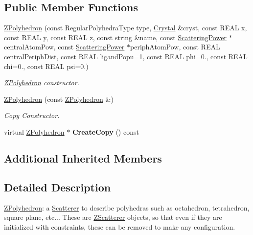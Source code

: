 \subsection*{Public Member Functions}
\begin{DoxyCompactItemize}
\item 
\mbox{\hyperlink{class_obj_cryst_1_1_z_polyhedron_a624314fc85edd2b27e572e33c1487bed}{Z\+Polyhedron}} (const Regular\+Polyhedra\+Type type, \mbox{\hyperlink{class_obj_cryst_1_1_crystal}{Crystal}} \&cryst, const R\+E\+AL x, const R\+E\+AL y, const R\+E\+AL z, const string \&name, const \mbox{\hyperlink{class_obj_cryst_1_1_scattering_power}{Scattering\+Power}} $\ast$central\+Atom\+Pow, const \mbox{\hyperlink{class_obj_cryst_1_1_scattering_power}{Scattering\+Power}} $\ast$periph\+Atom\+Pow, const R\+E\+AL central\+Periph\+Dist, const R\+E\+AL ligand\+Popu=1, const R\+E\+AL phi=0., const R\+E\+AL chi=0., const R\+E\+AL psi=0.)
\begin{DoxyCompactList}\small\item\em \mbox{\hyperlink{class_obj_cryst_1_1_z_polyhedron}{Z\+Polyhedron}} constructor. \end{DoxyCompactList}\item 
\mbox{\label{class_obj_cryst_1_1_z_polyhedron_a7d9b825ac03903e63d072c53fc791f50}} 
\mbox{\hyperlink{class_obj_cryst_1_1_z_polyhedron_a7d9b825ac03903e63d072c53fc791f50}{Z\+Polyhedron}} (const \mbox{\hyperlink{class_obj_cryst_1_1_z_polyhedron}{Z\+Polyhedron}} \&)
\begin{DoxyCompactList}\small\item\em Copy Constructor. \end{DoxyCompactList}\item 
\mbox{\label{class_obj_cryst_1_1_z_polyhedron_a5a14d182712517c9ecfeadbc31efb4a2}} 
virtual \mbox{\hyperlink{class_obj_cryst_1_1_z_polyhedron}{Z\+Polyhedron}} $\ast$ {\bfseries Create\+Copy} () const
\end{DoxyCompactItemize}
\subsection*{Additional Inherited Members}


\subsection{Detailed Description}
\mbox{\hyperlink{class_obj_cryst_1_1_z_polyhedron}{Z\+Polyhedron}}\+: a \mbox{\hyperlink{class_obj_cryst_1_1_scatterer}{Scatterer}} to describe polyhedras such as octahedron, tetrahedron, square plane, etc... These are \mbox{\hyperlink{class_obj_cryst_1_1_z_scatterer}{Z\+Scatterer}} objects, so that even if they are initialized with constraints, these can be removed to make any configuration. 

